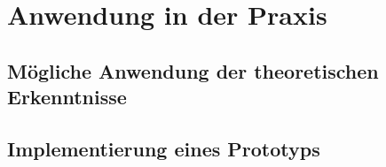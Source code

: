 \section{Anwendung in der Praxis}
\subsection{Mögliche Anwendung der theoretischen Erkenntnisse}
\subsection{Implementierung eines Prototyps}


 
